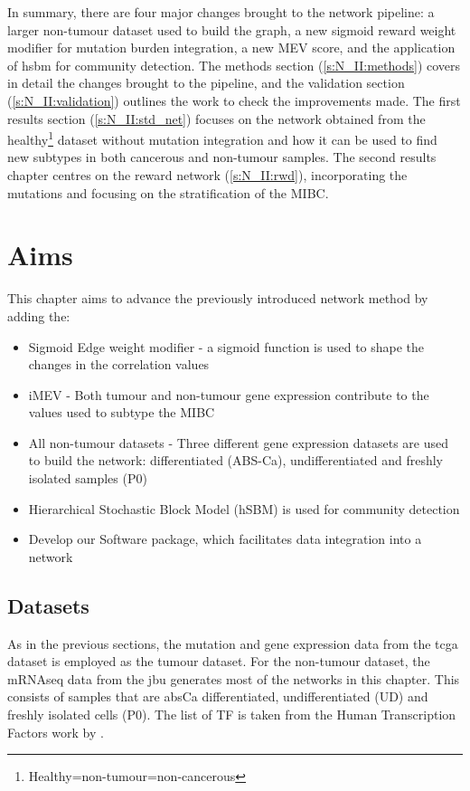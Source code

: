 In summary, there are four major changes brought to the network pipeline: a larger non-tumour dataset used to build the graph, a new sigmoid reward weight modifier for mutation burden integration, a new MEV score, and the application of \acrfull{hsbm} for community detection. The methods section (\ref{s:N_II:methods}) covers in detail the changes brought to the pipeline, and the validation section (\ref{s:N_II:validation}) outlines the work to check the improvements made. The first results section (\cref{s:N_II:std_net}) focuses on the network obtained from the healthy\footnote{Healthy=non-tumour=non-cancerous} dataset without mutation integration and how it can be used to find new subtypes in both cancerous and non-tumour samples. The second results chapter centres on the reward network (\ref{s:N_II:rwd}), incorporating the mutations and focusing on the stratification of the MIBC.


\section{Aims}

This chapter aims to advance the previously introduced network method by adding the:
\begin{itemize}
    \item Sigmoid Edge weight modifier - a sigmoid function is used to shape the changes in the correlation values
    \item iMEV - Both tumour and non-tumour gene expression contribute to the values used to subtype the MIBC
    \item All non-tumour datasets - Three different gene expression datasets are used to build the network: differentiated (ABS-Ca), undifferentiated and freshly isolated samples (P0)
    \item Hierarchical Stochastic Block Model (hSBM) is used for community detection
    \item Develop our Software package, which facilitates data integration into a network
\end{itemize}

\subsection*{Datasets}

As in the previous sections, the mutation and gene expression data from the \acrshort{tcga} dataset is employed as the tumour dataset. For the non-tumour dataset, the mRNAseq data from the \acrfull{jbu} generates most of the networks in this chapter. This consists of samples that are \acrfull{absCa} differentiated, undifferentiated (UD) and freshly isolated cells (P0). The list of TF is taken from the Human Transcription Factors work by \citet{Lambert2018-el}.

